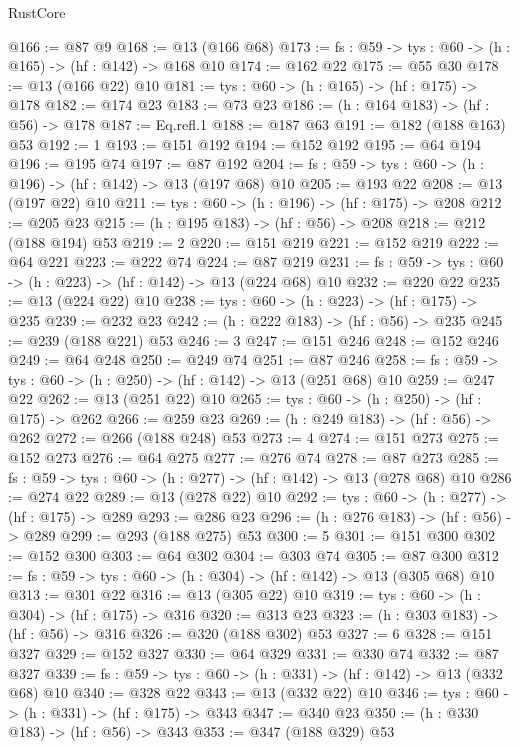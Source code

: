 \begin{lexlean}{RustCore}
\begin{coremodule}
@166 := @87 @9
@168 := @13 (@166 @68)
@173 := {fs : @59} -> {tys : @60} -> (h : @165) -> (hf : @142) -> @168 @10
@174 := @162 @22
@175 := @55 @30
@178 := @13 (@166 @22) @10
@181 := {tys : @60} -> (h : @165) -> (hf : @175) -> @178
@182 := @174 @23
@183 := @73 @23
@186 := (h : @164 @183) -> (hf : @56) -> @178
@187 := Eq.refl.{1}
@188 := @187 @63
@191 := @182 (@188 @163) @53
@192 := 1
@193 := @151 @192
@194 := @152 @192
@195 := @64 @194
@196 := @195 @74
@197 := @87 @192
@204 := {fs : @59} -> {tys : @60} -> (h : @196) -> (hf : @142) -> @13 (@197 @68) @10
@205 := @193 @22
@208 := @13 (@197 @22) @10
@211 := {tys : @60} -> (h : @196) -> (hf : @175) -> @208
@212 := @205 @23
@215 := (h : @195 @183) -> (hf : @56) -> @208
@218 := @212 (@188 @194) @53
@219 := 2
@220 := @151 @219
@221 := @152 @219
@222 := @64 @221
@223 := @222 @74
@224 := @87 @219
@231 := {fs : @59} -> {tys : @60} -> (h : @223) -> (hf : @142) -> @13 (@224 @68) @10
@232 := @220 @22
@235 := @13 (@224 @22) @10
@238 := {tys : @60} -> (h : @223) -> (hf : @175) -> @235
@239 := @232 @23
@242 := (h : @222 @183) -> (hf : @56) -> @235
@245 := @239 (@188 @221) @53
@246 := 3
@247 := @151 @246
@248 := @152 @246
@249 := @64 @248
@250 := @249 @74
@251 := @87 @246
@258 := {fs : @59} -> {tys : @60} -> (h : @250) -> (hf : @142) -> @13 (@251 @68) @10
@259 := @247 @22
@262 := @13 (@251 @22) @10
@265 := {tys : @60} -> (h : @250) -> (hf : @175) -> @262
@266 := @259 @23
@269 := (h : @249 @183) -> (hf : @56) -> @262
@272 := @266 (@188 @248) @53
@273 := 4
@274 := @151 @273
@275 := @152 @273
@276 := @64 @275
@277 := @276 @74
@278 := @87 @273
@285 := {fs : @59} -> {tys : @60} -> (h : @277) -> (hf : @142) -> @13 (@278 @68) @10
@286 := @274 @22
@289 := @13 (@278 @22) @10
@292 := {tys : @60} -> (h : @277) -> (hf : @175) -> @289
@293 := @286 @23
@296 := (h : @276 @183) -> (hf : @56) -> @289
@299 := @293 (@188 @275) @53
@300 := 5
@301 := @151 @300
@302 := @152 @300
@303 := @64 @302
@304 := @303 @74
@305 := @87 @300
@312 := {fs : @59} -> {tys : @60} -> (h : @304) -> (hf : @142) -> @13 (@305 @68) @10
@313 := @301 @22
@316 := @13 (@305 @22) @10
@319 := {tys : @60} -> (h : @304) -> (hf : @175) -> @316
@320 := @313 @23
@323 := (h : @303 @183) -> (hf : @56) -> @316
@326 := @320 (@188 @302) @53
@327 := 6
@328 := @151 @327
@329 := @152 @327
@330 := @64 @329
@331 := @330 @74
@332 := @87 @327
@339 := {fs : @59} -> {tys : @60} -> (h : @331) -> (hf : @142) -> @13 (@332 @68) @10
@340 := @328 @22
@343 := @13 (@332 @22) @10
@346 := {tys : @60} -> (h : @331) -> (hf : @175) -> @343
@347 := @340 @23
@350 := (h : @330 @183) -> (hf : @56) -> @343
@353 := @347 (@188 @329) @53

\end{coremodule}
\end{lexlean}
